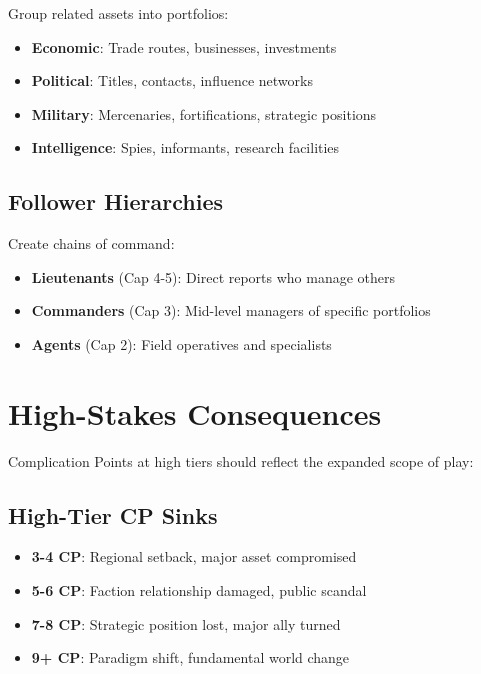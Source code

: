 Group related assets into portfolios:
\begin{itemize}
    \item \textbf{Economic}: Trade routes, businesses, investments
    \item \textbf{Political}: Titles, contacts, influence networks
    \item \textbf{Military}: Mercenaries, fortifications, strategic positions
    \item \textbf{Intelligence}: Spies, informants, research facilities
\end{itemize}

\subsection*{Follower Hierarchies}

Create chains of command:
\begin{itemize}
    \item \textbf{Lieutenants} (Cap 4-5): Direct reports who manage others
    \item \textbf{Commanders} (Cap 3): Mid-level managers of specific portfolios
    \item \textbf{Agents} (Cap 2): Field operatives and specialists
\end{itemize}

\section{High-Stakes Consequences}

Complication Points at high tiers should reflect the expanded scope of play:

\subsection*{High-Tier CP Sinks}

\begin{itemize}
    \item \textbf{3-4 CP}: Regional setback, major asset compromised
    \item \textbf{5-6 CP}: Faction relationship damaged, public scandal
    \item \textbf{7-8 CP}: Strategic position lost, major ally turned
    \item \textbf{9+ CP}: Paradigm shift, fundamental world change
\end{itemize}

